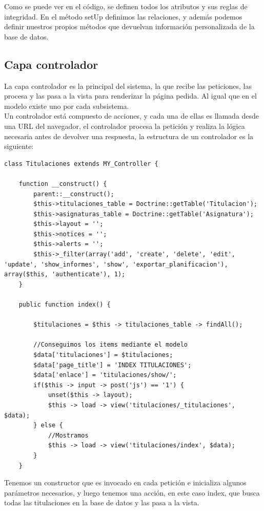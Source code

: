 \documentclass[a4paper,11pt]{article} %
\begin{document}
Como se puede ver en el código, se definen todos los atributos y sus reglas de integridad. En el método setUp definimos las relaciones, y además podemos definir nuestros propios métodos que devuelvan información personalizada de la base de datos.

\subsection{Capa controlador}

La capa controlador es la principal del sistema, la que recibe las peticiones, las procesa y las pasa a la vista para renderizar la página pedida. Al igual que en el modelo existe uno por cada subsistema.\\

Un controlador está compuesto de acciones, y cada una de ellas es llamada desde una URL del navegador, el controlador procesa la petición y realiza la lógica necesaria antes de devolver una respuesta, la estructura de un controlador es la siguiente:

\begin{lstlisting}[style=PHP]
class Titulaciones extends MY_Controller {

    function __construct() {
        parent::__construct();
        $this->titulaciones_table = Doctrine::getTable('Titulacion');
        $this->asignaturas_table = Doctrine::getTable('Asignatura');
        $this->layout = '';
        $this->notices = '';
        $this->alerts = '';
        $this->_filter(array('add', 'create', 'delete', 'edit', 'update', 'show_informes', 'show', 'exportar_planificacion'), array($this, 'authenticate'), 1); 
    }

    public function index() {

        $titulaciones = $this -> titulaciones_table -> findAll();

        //Conseguimos los items mediante el modelo
        $data['titulaciones'] = $titulaciones;
        $data['page_title'] = 'INDEX TITULACIONES';
        $data['enlace'] = 'titulaciones/show/';
        if($this -> input -> post('js') == '1') {
            unset($this -> layout);
            $this -> load -> view('titulaciones/_titulaciones', $data);
        } else {
            //Mostramos
            $this -> load -> view('titulaciones/index', $data);
        }
    }
\end{lstlisting}

Tenemos un constructor que es invocado en cada petición e inicializa algunos parámetros necesarios, y luego tenemos una acción, en este caso index, que busca todas las titulaciones en la base de datos y las pasa a la vista.
\end{document}
